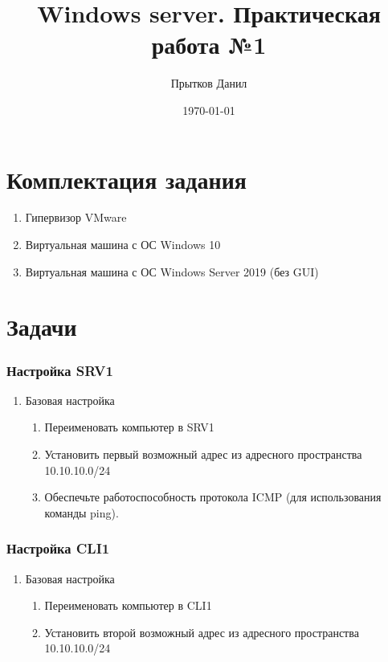 \documentclass[a4paper, 12pt]{report}
\author{Прытков Данил}
\title{Windows server. Практическая работа №1}
\date{\today}
\begin{document}
	
	\maketitle
	\clearpage

	\section{Комплектация задания}

	\begin{enumerate}
		\item Гипервизор VMware
		\item Виртуальная машина с ОС Windows 10
		\item Виртуальная машина с ОС Windows Server 2019 (без GUI)
	\end{enumerate}

	\section{Задачи}
	
	\subsubsection{Настройка SRV1}
	
	\begin{enumerate}
		\item Базовая настройка
		\begin{enumerate}
			\item Переименовать компьютер в SRV1
			\item Установить первый возможный адрес из адресного пространства 10.10.10.0/24
			\item Обеспечьте работоспособность протокола ICMP (для использования команды ping).
		\end{enumerate}
	\end{enumerate}

	\subsubsection{Настройка CLI1}

	\begin{enumerate}
		\item Базовая настройка
		\begin{enumerate}
			\item Переименовать компьютер в CLI1
			\item Установить второй возможный адрес из адресного пространства 10.10.10.0/24
		\end{enumerate}
	\end{enumerate}
\end{document}
